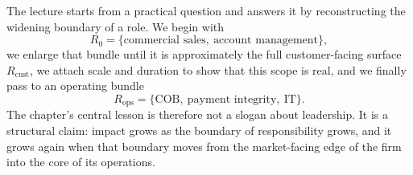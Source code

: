 The lecture starts from a practical question and answers it by reconstructing the widening boundary of a role. We begin with
\begin{equation}
R_0 = \{\text{commercial sales},\ \text{account management}\},
\end{equation}
we enlarge that bundle until it is approximately the full customer-facing surface \(R_{\mathrm{cust}}\), we attach scale and duration to show that this scope is real, and we finally pass to an operating bundle
\begin{equation}
R_{\mathrm{ops}} = \{\text{COB},\ \text{payment integrity},\ \text{IT}\}.
\end{equation}
The chapter's central lesson is therefore not a slogan about leadership. It is a structural claim: impact grows as the boundary of responsibility grows, and it grows again when that boundary moves from the market-facing edge of the firm into the core of its operations.